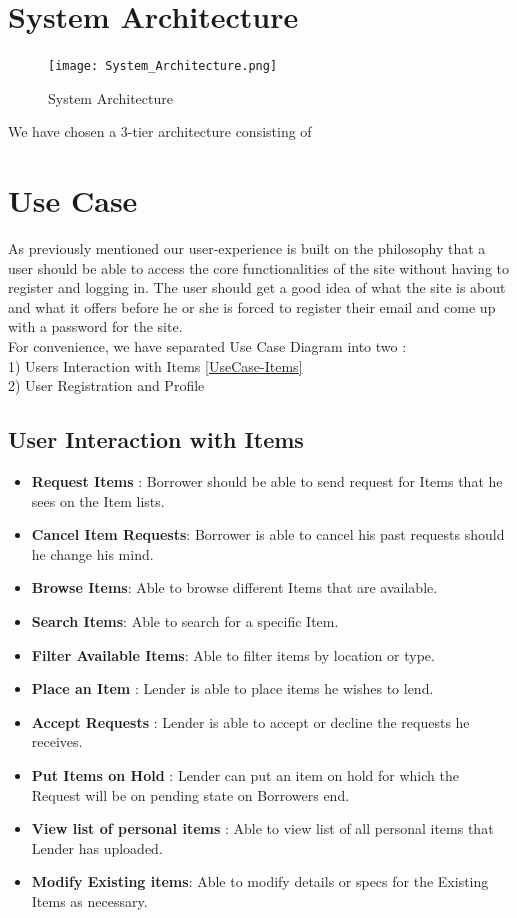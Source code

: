 \documentclass[a4paper]{article}
\begin{document}
\section{System Architecture }
\begin{figure}[H] 
  \centering
  \texttt{[image: System\_Architecture.png]}\hfill
  \caption{System Architecture}\label{System Architecture}
\end{figure}
We have chosen a 3-tier architecture consisting of 


\section{Use Case } As previously mentioned our user-experience is built on the philosophy that a user should be able to access the core functionalities of the site without having to register and logging in. The user should get a good idea of what the site is about and what it offers before he or she is forced to register their email and come up with a password for the site. \\
For convenience, we have separated Use Case Diagram into two : \\ 
1) Users Interaction with Items \ref{UseCase-Items}  \\ 
2) User Registration and Profile \\

\subsection{User Interaction with Items}
\begin{itemize}
\item \textbf{Request Items} : Borrower should be able to send request for Items that he sees on the Item lists.
\item \textbf{Cancel Item Requests}: Borrower is able to cancel his past requests should he change his mind.
\item \textbf{Browse Items}: Able to browse different Items that are available.
\item \textbf{Search Items}: Able to search for a specific Item.
\item \textbf{Filter Available Items}: Able to filter items by location or type.
\item \textbf{Place an Item} : Lender is able to place items he wishes to lend.
\item \textbf{Accept Requests} : Lender is able to accept or decline the requests he receives.
\item \textbf{Put Items on Hold} : Lender can put an item on hold for which the Request will be on pending state on Borrowers end.
\item \textbf{View list of personal items} : Able to view list of all personal items that Lender has uploaded.
\item \textbf{Modify Existing items}: Able to modify details or specs for the Existing Items as necessary.
\end{itemize}
\end{document}
